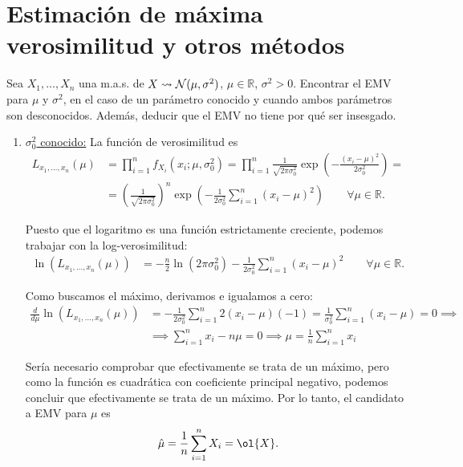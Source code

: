 \section{Estimación de máxima verosimilitud y otros métodos}

\begin{ejemplo}
    Sea $X_1, \ldots, X_n$ una m.a.s. de $X \rightsquigarrow \mathcal{N}(\mu, \sigma^2)$, $\mu \in \mathbb{R}$, $\sigma^2 > 0$. Encontrar el EMV para $\mu$ y $\sigma^2$, en el caso de un parámetro conocido y cuando ambos parámetros son desconocidos. Además, deducir que el EMV no tiene por qué ser insesgado.
    \begin{enumerate}
        \item \ul{$\sigma_0^2$ conocido:} La función de verosimilitud es
        \begin{align*}
            L_{x_1, \ldots, x_n}(\mu) &= \prod_{i=1}^{n} f_{X_i}(x_i; \mu, \sigma_0^2) = \prod_{i=1}^{n} \frac{1}{\sqrt{2\pi\sigma_0^2}} \exp(-\frac{(x_i - \mu)^2}{2\sigma_0^2}) =\\&= \left(\frac{1}{\sqrt{2\pi\sigma_0^2}}\right)^n \exp\left(-\frac{1}{2\sigma_0^2} \sum_{i=1}^{n} (x_i - \mu)^2\right)\qquad \forall \mu \in \mathbb{R}.
        \end{align*}

        Puesto que el logaritmo es una función estrictamente creciente, podemos trabajar con la log-verosimilitud:
        \begin{align*}
            \ln(L_{x_1, \ldots, x_n}(\mu)) &= -\frac{n}{2}\ln(2\pi\sigma_0^2) - \frac{1}{2\sigma_0^2} \sum_{i=1}^{n} (x_i - \mu)^2\qquad \forall \mu \in \mathbb{R}.
        \end{align*}

        Como buscamos el máximo, derivamos e igualamos a cero:
        \begin{align*}
            \frac{d}{d\mu} \ln(L_{x_1, \ldots, x_n}(\mu)) &= -\frac{1}{2\sigma_0^2} \sum_{i=1}^{n} 2(x_i - \mu)(-1) = \frac{1}{\sigma_0^2} \sum_{i=1}^{n} (x_i - \mu) = 0 \implies \\&\implies \sum_{i=1}^{n} x_i - n\mu = 0 \implies \mu = \frac{1}{n} \sum_{i=1}^{n} x_i
        \end{align*}

        Sería necesario comprobar que efectivamente se trata de un máximo, pero como la función es cuadrática con coeficiente principal negativo, podemos concluir que efectivamente se trata de un máximo. Por lo tanto, el candidato a EMV para $\mu$ es
        \begin{align*}
            \hat{\mu} = \frac{1}{n} \sum_{i=1}^{n} X_i = \ol{X}.
        \end{align*}


\end{enumerate}
\end{ejemplo}

